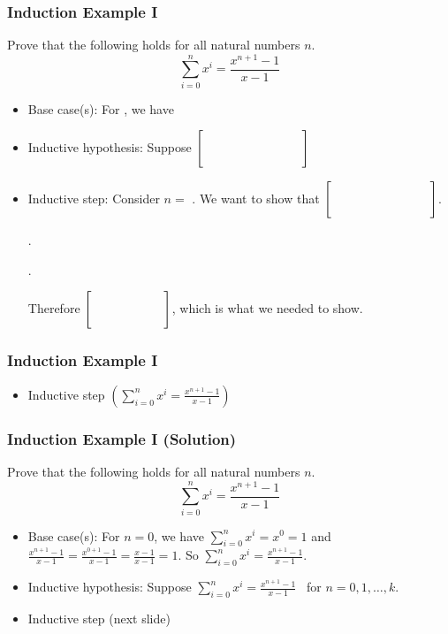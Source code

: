 \documentclass{beamer}
\newcommand{\blank}{\underbar{\hphantom{aaaaaaaa}}}
\begin{document}
\begin{frame}[t]
  \frametitle{Induction Example I}
  Prove that the following holds for all natural numbers $n$. \\
  $$\sum^{n}_{i=0} x^i = \frac{x^{n+1}-1}{x-1}$$
  \pause
  \begin{itemize}
    \item Base case(s): For \blank, we have  \\
    \vspace{0.3cm} 
    \item Inductive hypothesis: Suppose $\Bigg[\hphantom{{\blank\blank}}\Bigg]$
    \vspace{0.3cm} 
    \item Inductive step: Consider $n=$ \blank. We want to show that $\Bigg[\hphantom{{\blank\blank}}\Bigg]$. \\
    \begin{center}.\end{center}
    \begin{center}.\end{center}
    Therefore $\Bigg[\hphantom{{\blank hihi}}\Bigg]$, which is what we needed to show.
  \end{itemize}
\end{frame}

\begin{frame}[t]
  \frametitle{Induction Example I}

  \begin{itemize}
    \item Inductive step \hphantom{\blank\blank hihihi}$\left(\sum\limits^{n}_{i=0} x^i = \frac{x^{n+1}-1}{x-1}\right)$
  \end{itemize}
\end{frame}

\begin{frame}[t]
  \frametitle{Induction Example I (Solution)}
  Prove that the following holds for all natural numbers $n$. \\
  $$\sum^{n}_{i=0} x^i = \frac{x^{n+1}-1}{x-1}$$
  \begin{itemize}
    \item Base case(s): For $n=0$, we have $\sum_{i=0}^n x^i =x^0=1$ and $\frac{x^{n+1}-1}{x-1} = 
\frac{x^{0+1}-1}{x-1} = \frac{ x-1}{x-1} = 1$. So $\sum_{i=0}^n x^i =\frac{x^{n+1}-1}{x-1}$. \\
    \item Inductive hypothesis: Suppose $\sum^{n}_{i=0} x^i = \frac{x^{n+1}-1}{x-1}$ \ for $n = 0, 1, \ldots, k$. 
    \item Inductive step (next slide)
  \end{itemize}
\end{frame}
\end{document}
